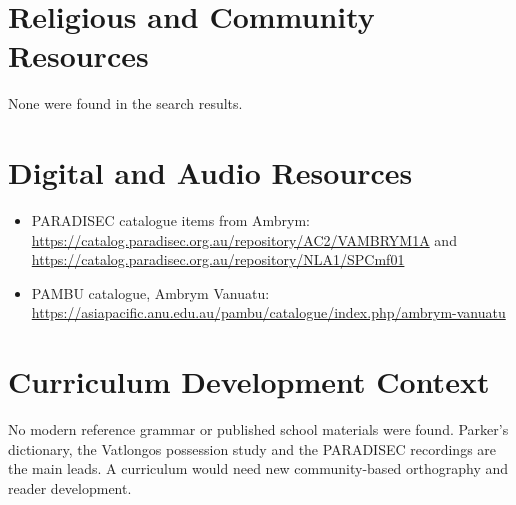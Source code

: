 \documentclass[12pt]{article}
\begin{document}
\section{Religious and Community Resources}
None were found in the search results.

\section{Digital and Audio Resources}
\begin{itemize}
\item PARADISEC catalogue items from Ambrym: \url{https://catalog.paradisec.org.au/repository/AC2/VAMBRYM1A} and \url{https://catalog.paradisec.org.au/repository/NLA1/SPCmf01}
\item PAMBU catalogue, Ambrym Vanuatu: \url{https://asiapacific.anu.edu.au/pambu/catalogue/index.php/ambrym-vanuatu}
\end{itemize}

\section{Curriculum Development Context}
No modern reference grammar or published school materials were found. Parker's dictionary, the Vatlongos possession study and the PARADISEC recordings are the main leads. A curriculum would need new community-based orthography and reader development.
\end{document}

